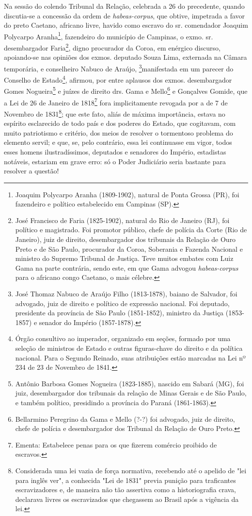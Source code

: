 Na sessão do colendo Tribunal da Relação, celebrada a 26 do precedente,
quando discutia-se a concessão da ordem de \emph{habeas-corpus}, que
obtive, impetrada a favor do preto Caetano, africano livre, havido como
escravo do sr. comendador Joaquim Polycarpo Aranha\footnote{Joaquim
  Polycarpo Aranha (1809-1902), natural de Ponta Grossa (PR), foi
  fazendeiro e político estabelecido em Campinas (SP).}, fazendeiro do
município de Campinas, o exmo. sr. desembargador Faria\footnote{José
  Francisco de Faria (1825-1902), natural do Rio de Janeiro (RJ), foi
  político e magistrado. Foi promotor público, chefe de polícia da Corte
  (Rio de Janeiro), juiz de direito, desembargador dos tribunais da
  Relação de Ouro Preto e de São Paulo, procurador da Coroa, Soberania e
  Fazenda Nacional e ministro do Supremo Tribunal de Justiça. Teve
  muitos embates com Luiz Gama na parte contrária, sendo este, em que
  Gama advogou \emph{habeas-corpus} para o africano congo Caetano, o
  mais célebre.}, digno procurador da Coroa, em enérgico discurso,
apoiando-se nas opiniões dos exmos. deputado Souza Lima, externada na
Câmara temporária, e conselheiro Nabuco de Araújo, \footnote{José
  Thomaz Nabuco de Araújo Filho (1813-1878), baiano de Salvador, foi
  advogado, juiz de direito e político de expressão nacional. Foi
  deputado, presidente da província de São Paulo (1851-1852), ministro
  da Justiça (1853-1857) e senador do Império (1857-1878).}manifestada
em um parecer do Conselho de Estado\footnote{Órgão consultivo ao
  imperador, organizado em seções, formado por uma seleção de ministros
  de Estado e outras figuras-chave do direito e da política nacional.
  Para o Segundo Reinado, suas atribuições estão marcadas na Lei nº 234
  de 23 de Novembro de 1841.}, afirmou, por entre aplausos dos exmos.
desembargador Gomes Nogueira\footnote{Antônio Barbosa Gomes Nogueira
  (1823-1885), nascido em Sabará (MG), foi juiz, desembargador dos
  tribunais da relação de Minas Gerais e de São Paulo, e também
  político, presidindo a província do Paraná (1861-1863).} e juízes de
direito drs. Gama e Mello\footnote{Bellarmino Peregrino da Gama e
  Mello (?-?) foi advogado, juiz de direito, chefe de polícia e
  desembargador dos Tribunal da Relação de Ouro Preto.} e Gonçalves
Gomide, que a Lei de 26 de Janeiro de 1818\footnote{Ementa: Estabelece
  penas para os que fizerem comércio proibido de escravos.} fora
implicitamente revogada por a de 7 de Novembro de 1831\footnote{
  Considerada uma lei vazia de força normativa, recebendo até o apelido
  de "lei para inglês ver", a conhecida "Lei de 1831" previa punição
  para traficantes escravizadores e, de maneira não tão assertiva como a
  historiografia crava, declarava livres os escravizados que chegassem
  ao Brasil após a vigência da lei.}; que este fato, aliás de máxima
importância, estava no espírito esclarecido de todo país e dos poderes
do Estado, que cogitavam, com muito patriotismo e critério, dos meios de
resolver o tormentoso problema do elemento servil; e que, se, pelo
contrário, essa lei continuasse em vigor, todos esses homens
ilustradíssimos, deputados e senadores do Império, estadistas notáveis,
estariam em grave erro: só o Poder Judiciário seria bastante para
resolver a questão!


